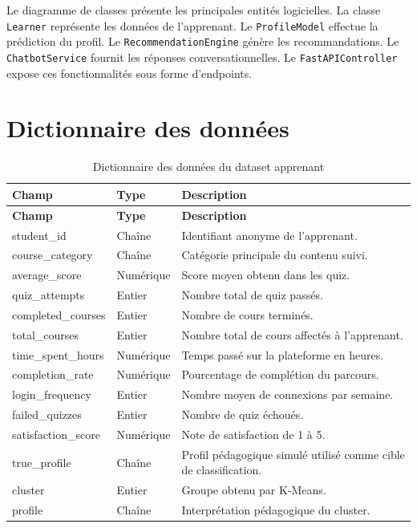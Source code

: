 \documentclass[12pt,a4paper]{report}
\begin{document}
Le diagramme de classes présente les principales entités logicielles. La classe \texttt{Learner} représente les données de l'apprenant. Le \texttt{ProfileModel} effectue la prédiction du profil. Le \texttt{RecommendationEngine} génère les recommandations. Le \texttt{ChatbotService} fournit les réponses conversationnelles. Le \texttt{FastAPIController} expose ces fonctionnalités sous forme d'endpoints.

\section{Dictionnaire des données}

\begin{longtable}{|p{4cm}|p{3cm}|p{7cm}|}
\caption{Dictionnaire des données du dataset apprenant}\\
\hline
\textbf{Champ} & \textbf{Type} & \textbf{Description} \\
\hline
\endfirsthead
\hline
\textbf{Champ} & \textbf{Type} & \textbf{Description} \\
\hline
\endhead
student\_id & Chaîne & Identifiant anonyme de l'apprenant. \\
\hline
course\_category & Chaîne & Catégorie principale du contenu suivi. \\
\hline
average\_score & Numérique & Score moyen obtenu dans les quiz. \\
\hline
quiz\_attempts & Entier & Nombre total de quiz passés. \\
\hline
completed\_courses & Entier & Nombre de cours terminés. \\
\hline
total\_courses & Entier & Nombre total de cours affectés à l'apprenant. \\
\hline
time\_spent\_hours & Numérique & Temps passé sur la plateforme en heures. \\
\hline
completion\_rate & Numérique & Pourcentage de complétion du parcours. \\
\hline
login\_frequency & Entier & Nombre moyen de connexions par semaine. \\
\hline
failed\_quizzes & Entier & Nombre de quiz échoués. \\
\hline
satisfaction\_score & Numérique & Note de satisfaction de 1 à 5. \\
\hline
true\_profile & Chaîne & Profil pédagogique simulé utilisé comme cible de classification. \\
\hline
cluster & Entier & Groupe obtenu par K-Means. \\
\hline
profile & Chaîne & Interprétation pédagogique du cluster. \\
\hline
\end{longtable}
\end{document}
